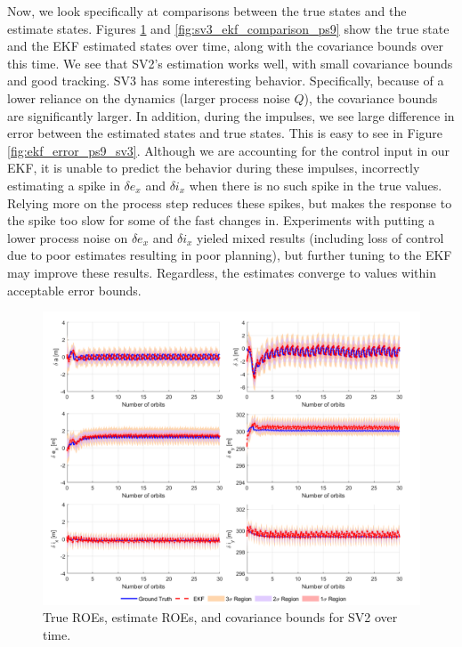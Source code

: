 Now, we look specifically at comparisons between the true states and the estimate states. Figures \ref{fig:sv2_ekf_comparison_ps9} and \ref{fig:sv3_ekf_comparison_ps9} show the true state and the EKF estimated states over time, along with the covariance bounds over this time. We see that SV2's estimation works well, with small covariance bounds and good tracking. SV3 has some interesting behavior. Specifically, because of a lower reliance on the dynamics (larger process noise $Q$), the covariance bounds are significantly larger. In addition, during the impulses, we see large difference in error between the estimated states and true states. This is easy to see in Figure \ref{fig:ekf_error_ps9_sv3}. Although we are accounting for the control input in our EKF, it is unable to predict the behavior during these impulses, incorrectly estimating a spike in $\delta e_x$ and $\delta i_x$ when there is no such spike in the true values. Relying more on the process step reduces these spikes, but makes the response to the spike too slow for some of the fast changes in. Experiments with putting a lower process noise on $\delta e_x$ and $\delta i_x$ yieled mixed results (including loss of control due to poor estimates resulting in poor planning), but further tuning to the EKF may improve these results. Regardless, the estimates converge to values within acceptable error bounds.

\begin{figure}[H]
    \centering
    \includegraphics[width=0.7\linewidth]{sim/figures/PS9/ROE_over_time_SV2_comparison.png}
    \caption{True ROEs, estimate ROEs, and covariance bounds for SV2 over time.}
    \label{fig:sv2_ekf_comparison_ps9}
\end{figure}

